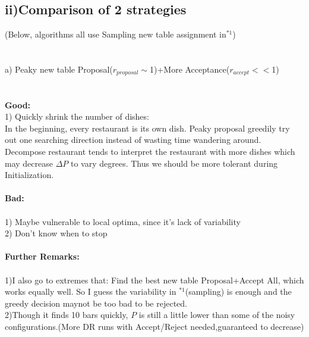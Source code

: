 \documentclass{article}
\begin{document}
\begin{spacing}{1.1}
\subsection{ii)Comparison of 2 strategies}
(Below, algorithms all use Sampling new table assignment in$^{*1}$)\\ \\ \\
a) Peaky new table Proposal($r_{proposal}\sim$1)+More Acceptance($r_{accept}<<$1)\\ \\ \\
{\bf Good:}\\ 
1) Quickly shrink the number of dishes:\\
In the beginning, every restaurant is its own dish. Peaky proposal greedily try out one searching direction instead of wasting time wandering around.
Decompose restaurant tends to interpret the restaurant with more dishes which may decrease $\Delta P$ to vary degrees. Thus we should be 
more tolerant during Initialization.\\ \\
{\bf Bad:}\\ \\
1) Maybe vulnerable to local optima, since it's lack of variability\\
2) Don't know when to stop\\ \\
{\bf Further Remarks:}\\ \\
1)I also go to extremes that: Find the best new table Proposal+Accept All, which works equally well. So I guess the variability in $^{*1}$(sampling) is enough and
the greedy decision maynot be too bad to be rejected.\\
2)Though it finds 10 bars quickly, $P$ is still a little lower than some of the noisy configurations.(More DR runs with Accept/Reject needed,guaranteed to decrease)


\end{spacing}
\end{document}

